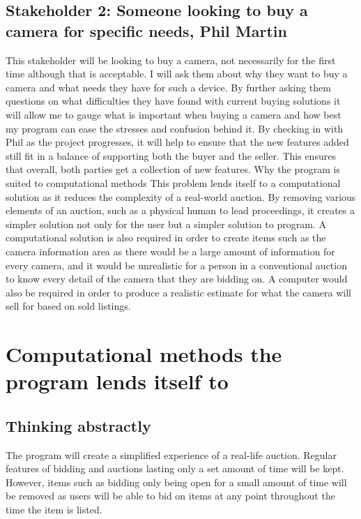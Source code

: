 \subsection{Stakeholder 2: Someone looking to buy a camera for specific needs, Phil Martin}
This stakeholder will be looking to buy a camera, not necessarily for the first time although that is acceptable. I will ask them about why they want to buy a camera and what needs they have for such a device. By further asking them questions on what difficulties they have found with current buying solutions it will allow me to gauge what is important when buying a camera and how best my program can ease the stresses and confusion behind it. By checking in with Phil as the project progresses, it will help to ensure that the new features added still fit in a balance of supporting both the buyer and the seller. This ensures that overall, both parties get a collection of new features.
{Why the program is suited to computational methods}
This problem lends itself to a computational solution as it reduces the complexity of a real-world auction. By removing various elements of an auction, such as a physical human to lead proceedings, it creates a simpler solution not only for the user but a simpler solution to program. A computational solution is also required in order to create items such as the camera information area as there would be a large amount of information for every camera, and it would be unrealistic for a person in a conventional auction to know every detail of the camera that they are bidding on. A computer would also be required in order to produce a realistic estimate for what the camera will sell for based on sold listings.

\section{Computational methods the program lends itself to}
\subsection{Thinking abstractly}
The program will create a simplified experience of a real-life auction. Regular features of bidding and auctions lasting only a set amount of time will be kept. However, items such as bidding only being open for a small amount of time will be removed as users will be able to bid on items at any point throughout the time the item is listed.
